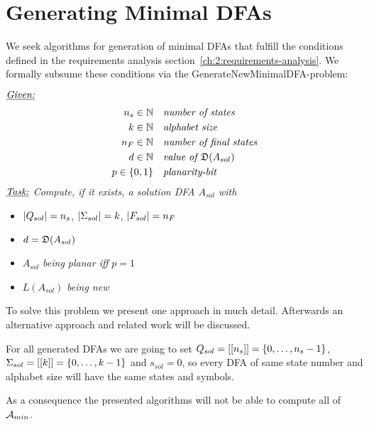 
\chapter{Generating Minimal DFAs} \label{ch:3}

We seek algorithms for generation of minimal DFAs that fulfill the conditions defined in the requirements analysis section~\ref{ch:2:requirements-analysis}. We formally subsume these conditions via the GenerateNewMinimalDFA-problem:
\begin{definition}[GenNewMinDFA] $ $ \\
	$ $ \vspace{-0.4cm} \\
	\noindent $\underline{\emph{Given:}}$
	\vspace{-0.5cm}
	\begin{align*}
	{n_s} \in \mathbb{N}\ \ \ & \emph{number of states} \\
	k \in \mathbb{N}\ \ \ & \emph{alphabet size} \\
	{n_F} \in \mathbb{N}\ \ \ & \emph{number of final states} \\
	d \in \mathbb{N}\ \ \ & \emph{value of $\mathfrak{D}(A_{sol})$} \\
	p \in \{0,1\}\ \ \ & \emph{planarity-bit}
	\end{align*}
	\noindent $\underline{\emph{Task:}}$ \emph{Compute, if it exists, a solution DFA $A_{sol}$ with}
	\begin{itemize}
		\item $|Q_{sol}|={n_s}$, $|\Sigma_{sol}|=k$, $|F_{sol}|={n_F}$
		\item $d = \mathfrak{D}(A_{sol})$
		\item $A_{sol}$ \emph{being planar iff} $p = 1$
		\item $L(A_{sol})$ \emph{being new}
	\end{itemize}
\end{definition}
\noindent To solve this problem we present one approach in much detail. Afterwards an alternative approach and related work will be discussed.

\begin{remark}\label{ch:3:rem:qas-set}
	For all generated DFAs we are going to set $Q_{sol} = [[{n_s}]] = \{0,\ldots,{n_s}-1\}$, $\Sigma_{sol} = [[k]] = \{0,\ldots,k-1\}$ and $s_{sol} = 0$, so every DFA of same state number and alphabet size will have the same states and symbols.
\end{remark}
\noindent As a consequence the presented algorithms will not be able to compute all of ${\mathcal{A}_{min}}$.

